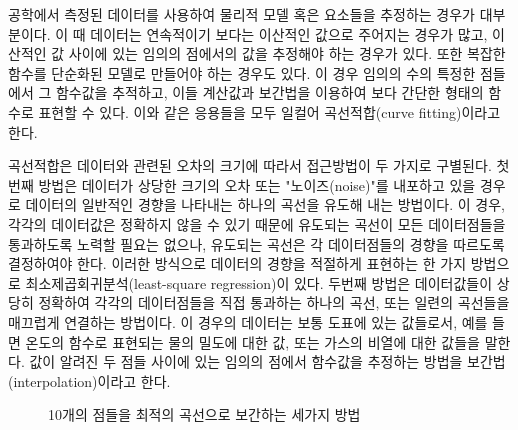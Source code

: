 공학에서 측정된 데이터를 사용하여 물리적 모델 혹은 요소들을 추정하는 경우가 대부분이다. 이 때 데이터는 연속적이기 보다는 이산적인 값으로 주어지는 경우가 많고, 이산적인 값 사이에 있는 임의의 점에서의 값을 추정해야 하는 경우가 있다. 또한 복잡한 함수를 단순화된 모델로 만들어야 하는 경우도 있다. 이 경우 임의의 수의 특정한 점들에서 그 함수값을 추적하고, 이들 계산값과 보간법을 이용하여 보다 간단한 형태의 함수로 표현할 수 있다. 이와 같은 응용들을 모두 일컬어 곡선적합(curve fitting)이라고 한다.

곡선적합은 데이터와 관련된 오차의 크기에 따라서 접근방법이 두 가지로 구별된다. 첫 번째 방법은 데이터가 상당한 크기의 오차 또는 "노이즈(noise)"를 내포하고 있을 경우로 데이터의 일반적인 경향을 나타내는 하나의 곡선을 유도해 내는 방법이다. 이 경우, 각각의 데이터값은 정확하지 않을 수 있기 때문에 유도되는 곡선이 모든 데이터점들을 통과하도록 노력할 필요는 없으나, 유도되는 곡선은 각 데이터점들의 경향을 따르도록 결정하여야 한다. 이러한 방식으로 데이터의 경향을 적절하게 표현하는 한 가지 방법으로 최소제곱회귀분석(least-square regression)이 있다. 두번째 방법은 데이터값들이 상당히 정확하여 각각의 데이터점들을 직접 통과하는 하나의 곡선, 또는 일련의 곡선들을 매끄럽게 연결하는 방법이다. 이 경우의 데이터는 보통 도표에 있는 값들로서, 예를 들면 온도의 함수로 표현되는 물의 밀도에 대한 값, 또는 가스의 비열에 대한 값들을 말한다. 값이 알려진 두 점들 사이에 있는 임의의 점에서 함수값을 추정하는 방법을 보간법(interpolation)이라고 한다.

\begin{figure}[!hbpt]
\centering
{}
\label{fig:pt5-1}
\caption{10개의 점들을 최적의 곡선으로 보간하는 세가지 방법}
\end{figure}

